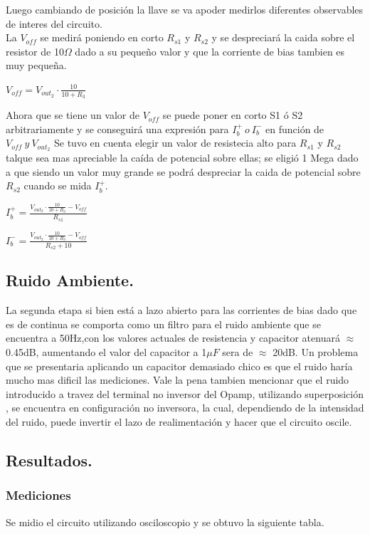 Luego cambiando de posición la llave se va apoder medirlos diferentes observables de interes del circuito.\\
La $V_{off}$ se medirá poniendo en corto $R_{s1}$ y $R_{s2}$ y se despreciará la caida sobre el resistor de 10$\Omega$ dado a su pequeño valor y que la corriente de bias tambien es muy pequeña.\\
\begin{center}$V_{off}=V_{out_2} \cdot \frac{10}{10+R_3} $\end{center}
Ahora que se tiene un valor de $V_{off}$ se  puede poner en corto S1 ó S2 arbitrariamente y se conseguirá una expresión para $ I_b^+ \ o \  I_b^-$ en función de $V_{off} \ y \ V_{out_2}$
Se tuvo en cuenta elegir un valor de resistecia alto para $R_{s1}$ y $R_{s2}$ talque sea mas apreciable la caída de potencial sobre ellas; se eligió 1 Mega dado a que siendo un valor muy grande se podrá despreciar la caida de potencial sobre $R_{s2}$  cuando se mida $I_b^+$.\\
\begin{center}$I_b^+=\frac{V_{out_2} \cdot \frac{10}{10+R_3}-V_{off}}{R_{s1}}$\end{center}
\begin{center}$I_b^-=\frac{V_{out_2} \cdot \frac{10}{10+R_3}-V_{off}}{R_{s2}+10}$\end{center}

\subsection{Ruido Ambiente.}
La segunda etapa si bien está a lazo abierto para las corrientes de bias dado que es de continua se comporta como un filtro para el ruido ambiente que se encuentra a 50Hz,con los valores actuales de resistencia y capacitor atenuará $\approx$ 0.45dB, aumentando el valor del capacitor a 1$\mu F$ sera de  $\approx$ 20dB.
Un problema que se presentaria aplicando un capacitor demasiado chico es que el ruido haría mucho mas dificil las mediciones.
Vale la pena tambien mencionar que el ruido introducido a travez del terminal no inversor del Opamp, utilizando superposición , se encuentra en configuración no inversora, la cual, dependiendo de la intensidad del ruido, puede invertir el lazo de realimentación y hacer que el circuito oscile.
\subsection{Resultados.}
\subsubsection{Mediciones}
Se midio el circuito utilizando osciloscopio y se  obtuvo la siguiente tabla.



